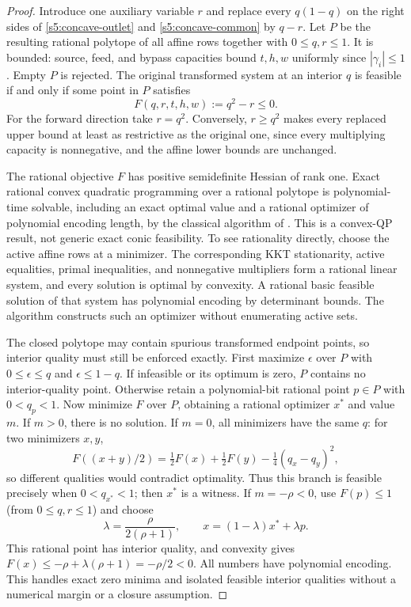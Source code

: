 \begin{proof}
Introduce one auxiliary variable $r$ and replace every $q(1-q)$ on
the right sides of \eqref{s5:concave-outlet} and
\eqref{s5:concave-common} by $q-r$. Let $P$ be the resulting rational
polytope of all affine rows together with $0\le q,r\le1$. It is
bounded: source, feed, and bypass capacities bound $t,h,w$ uniformly
since $|\gamma_i|\le1$. Empty $P$ is rejected. The original transformed
system at an interior $q$ is feasible if and only if some point in $P$
satisfies
\begin{equation}
 F(q,r,t,h,w):=q^2-r\le0.
 \label{s5:single-qp}
\end{equation}
For the forward direction take $r=q^2$. Conversely, $r\ge q^2$ makes every replaced
upper bound at least as restrictive as the original one, since every
multiplying capacity is nonnegative, and the affine lower bounds
are unchanged.

The rational objective $F$ has positive semidefinite Hessian of rank
one. Exact rational convex quadratic programming over a rational
polytope is polynomial-time solvable, including an exact optimal value
and a rational optimizer of polynomial encoding length, by the
classical algorithm of \citet[pp.~1320--1323; numbered paragraphs~3
and~6 for rational optimal solutions and recovery]{s5:kozlov1980}.
This is a convex-QP result, not generic exact conic
feasibility. To see rationality directly, choose the active affine
rows at a minimizer. The corresponding KKT stationarity,
active equalities, primal inequalities, and nonnegative multipliers
form a rational linear system, and every solution is optimal by convexity.
A rational basic feasible solution of that system has polynomial
encoding by determinant bounds. The algorithm constructs such an
optimizer without enumerating active sets.

The closed polytope may contain spurious transformed endpoint points,
so interior quality must still be enforced exactly. First maximize
$\epsilon$ over $P$ with
$0\le\epsilon\le q$ and $\epsilon\le1-q$. If infeasible or its optimum
is zero, $P$ contains no interior-quality point. Otherwise retain a
polynomial-bit rational point $p\in P$ with $0<q_p<1$. Now minimize
$F$ over $P$, obtaining a rational optimizer $x^*$ and value $m$.
If $m>0$, there is no solution. If $m=0$, all minimizers have the same
$q$: for two minimizers $x,y$,
\[
 F((x+y)/2)=\tfrac12F(x)+\tfrac12F(y)-\tfrac14(q_x-q_y)^2,
\]
so different qualities would contradict optimality. Thus this branch
is feasible precisely when $0<q_{x^*}<1$; then $x^*$ is a witness.
If $m=-\rho<0$, use $F(p)\le1$ (from $0\le q,r\le1$) and choose
\[
 \lambda=\frac{\rho}{2(\rho+1)},\qquad
 x=(1-\lambda)x^*+\lambda p.
\]
This rational point has interior quality, and convexity gives
$F(x)\le-\rho+\lambda(\rho+1)=-\rho/2<0$. All numbers have polynomial
encoding. This handles exact zero minima and isolated feasible interior
qualities without a numerical margin or a closure assumption.


\end{proof}
